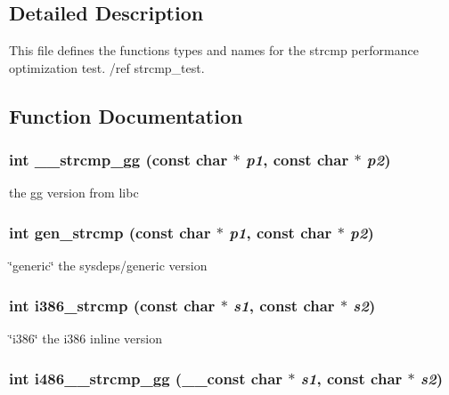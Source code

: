 \subsection{Detailed Description}
This file defines the functions types and names for the strcmp performance optimization test. /ref strcmp\_\-test.





\subsection{Function Documentation}
\subsubsection{\setlength{\rightskip}{0pt plus 5cm}int \_\-\_\-strcmp\_\-gg (const char $\ast$ {\em p1}, const char $\ast$ {\em p2})}\label{strcmp_2def__test_8h_a5}


the gg version from libc 
\subsubsection{\setlength{\rightskip}{0pt plus 5cm}int gen\_\-strcmp (const char $\ast$ {\em p1}, const char $\ast$ {\em p2})}\label{strcmp_2def__test_8h_a6}


\char`\"{}generic\char`\"{} the sysdeps/generic version 
\subsubsection{\setlength{\rightskip}{0pt plus 5cm}int i386\_\-strcmp (const char $\ast$ {\em s1}, const char $\ast$ {\em s2})}\label{strcmp_2def__test_8h_a7}


\char`\"{}i386\char`\"{} the i386 inline version 
\subsubsection{\setlength{\rightskip}{0pt plus 5cm}int i486\_\-\_\-strcmp\_\-gg (\_\-\_\-const char $\ast$ {\em s1}, const char $\ast$ {\em s2})}\label{strcmp_2def__test_8h_a8}


